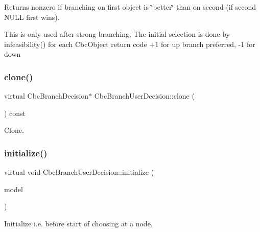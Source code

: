 Returns nonzero if branching on first object is \char`\"{}better\char`\"{} than on second (if second N\+U\+LL first wins). 

This is only used after strong branching. The initial selection is done by infeasibility() for each Cbc\+Object return code +1 for up branch preferred, -\/1 for down \mbox{\label{classCbcBranchUserDecision_a733a073ac6943512745d1c06f7c3bd03}} 
\subsubsection{\texorpdfstring{clone()}{clone()}}
{\footnotesize\ttfamily virtual Cbc\+Branch\+Decision$\ast$ Cbc\+Branch\+User\+Decision\+::clone (\begin{DoxyParamCaption}{ }\end{DoxyParamCaption}) const\hspace{0.3cm}{\ttfamily [virtual]}}



Clone. 

\mbox{\label{classCbcBranchUserDecision_adebf83d8e1a98bbdc5dc0377871f14f5}} 
\subsubsection{\texorpdfstring{initialize()}{initialize()}}
{\footnotesize\ttfamily virtual void Cbc\+Branch\+User\+Decision\+::initialize (\begin{DoxyParamCaption}\item[{Cbc\+Model $\ast$}]{model }\end{DoxyParamCaption})\hspace{0.3cm}{\ttfamily [virtual]}}



Initialize i.\+e. before start of choosing at a node. 

\mbox{\label{classCbcBranchUserDecision_a404dd442ed444810b03e46fe7e07516b}} 
